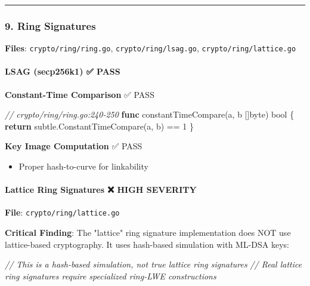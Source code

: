 \documentclass[
]{article}
\newenvironment{Shaded}{}{}
\newcommand{\CommentTok}[1]{\textcolor[rgb]{0.38,0.63,0.69}{\textit{#1}}}
\newcommand{\ControlFlowTok}[1]{\textcolor[rgb]{0.00,0.44,0.13}{\textbf{#1}}}
\newcommand{\DataTypeTok}[1]{\textcolor[rgb]{0.56,0.13,0.00}{#1}}
\newcommand{\DecValTok}[1]{\textcolor[rgb]{0.25,0.63,0.44}{#1}}
\newcommand{\KeywordTok}[1]{\textcolor[rgb]{0.00,0.44,0.13}{\textbf{#1}}}
\newcommand{\NormalTok}[1]{#1}
\newcommand{\OperatorTok}[1]{\textcolor[rgb]{0.40,0.40,0.40}{#1}}
\providecommand{\tightlist}{%
  \setlength{\itemsep}{0pt}\setlength{\parskip}{0pt}}
\begin{document}
\begin{center}\rule{0.5\linewidth}{0.5pt}\end{center}

\subsubsection{9. Ring Signatures}\label{9-ring-signatures}

\textbf{Files}: \texttt{crypto/ring/ring.go},
\texttt{crypto/ring/lsag.go}, \texttt{crypto/ring/lattice.go}

\paragraph{LSAG (secp256k1) ✅
PASS}\label{lsag-secp256k1-white_check_mark-pass}

\textbf{Constant-Time Comparison} ✅ PASS

\begin{Shaded}
\begin{Highlighting}[]
\CommentTok{// crypto/ring/ring.go:240{-}250}
\KeywordTok{func}\NormalTok{ constantTimeCompare}\OperatorTok{(}\NormalTok{a}\OperatorTok{,}\NormalTok{ b }\OperatorTok{[]}\DataTypeTok{byte}\OperatorTok{)} \DataTypeTok{bool} \OperatorTok{\{}
    \ControlFlowTok{return}\NormalTok{ subtle}\OperatorTok{.}\NormalTok{ConstantTimeCompare}\OperatorTok{(}\NormalTok{a}\OperatorTok{,}\NormalTok{ b}\OperatorTok{)} \OperatorTok{==} \DecValTok{1}
\OperatorTok{\}}
\end{Highlighting}
\end{Shaded}

\textbf{Key Image Computation} ✅ PASS

\begin{itemize}
\tightlist
\item
  Proper hash-to-curve for linkability
\end{itemize}

\paragraph{Lattice Ring Signatures ❌ HIGH
SEVERITY}\label{lattice-ring-signatures-x-high-severity}

\textbf{File}: \texttt{crypto/ring/lattice.go}

\textbf{Critical Finding}: The "lattice" ring signature implementation
does NOT use lattice-based cryptography. It uses hash-based simulation
with ML-DSA keys:

\begin{Shaded}
\begin{Highlighting}[]
\CommentTok{// This is a hash{-}based simulation, not true lattice ring signatures}
\CommentTok{// Real lattice ring signatures require specialized ring{-}LWE constructions}
\end{Highlighting}
\end{Shaded}
\end{document}
